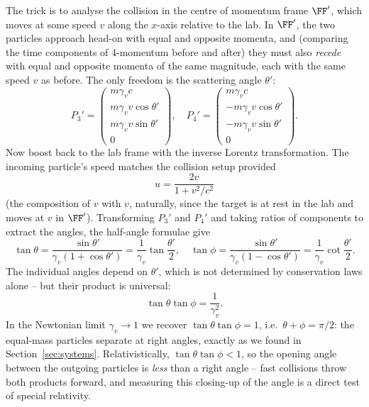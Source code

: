 \documentclass[a4paper]{scrartcl}
\begin{document}
The trick is to analyse the collision in the centre of momentum frame $\FF'$, which moves at some speed $v$ along the $x$-axis relative to the lab. In $\FF'$, the two particles approach head-on with equal and opposite momenta, and (comparing the time components of 4-momentum before and after) they must also \emph{recede} with equal and opposite momenta of the same magnitude, each with the same speed $v$ as before. The only freedom is the scattering angle $\theta'$:
$$
P_3' = \begin{pmatrix} m\gamma_v c \\ m \gamma_v v \cos\theta' \\ m \gamma_v v \sin \theta' \\ 0\end{pmatrix}, \quad P_4' = \begin{pmatrix} m\gamma_v c \\ -m \gamma_v v \cos\theta' \\ -m \gamma_v v \sin \theta' \\ 0\end{pmatrix}.
$$
Now boost back to the lab frame with the inverse Lorentz transformation. The incoming particle's speed matches the collision setup provided
$$
u = \frac{2v}{1 + v^2/c^2}
$$
(the composition of $v$ with $v$, naturally, since the target is at rest in the lab and moves at $v$ in $\FF'$). Transforming $P_3'$ and $P_4'$ and taking ratios of components to extract the angles, the half-angle formulae give
$$
\tan \theta = \frac{\sin\theta'}{\gamma_v (1 + \cos\theta')} = \frac{1}{\gamma_v} \tan \frac{\theta'}{2}, \quad
\tan \phi = \frac{\sin\theta'}{\gamma_v (1 - \cos\theta')} = \frac{1}{\gamma_v} \cot \frac{\theta'}{2}.
$$
The individual angles depend on $\theta'$, which is not determined by conservation laws alone -- but their product is universal:
$$
\tan\theta \tan\phi = \frac{1}{\gamma_v^2}.
$$
In the Newtonian limit $\gamma_v \to 1$ we recover $\tan\theta\tan\phi = 1$, i.e.\ $\theta + \phi = \pi/2$: the equal-mass particles separate at right angles, exactly as we found in Section~\ref{sec:systems}. Relativistically, $\tan\theta\tan\phi < 1$, so the opening angle between the outgoing particles is \emph{less} than a right angle -- fast collisions throw both products forward, and measuring this closing-up of the angle is a direct test of special relativity.
\end{document}
